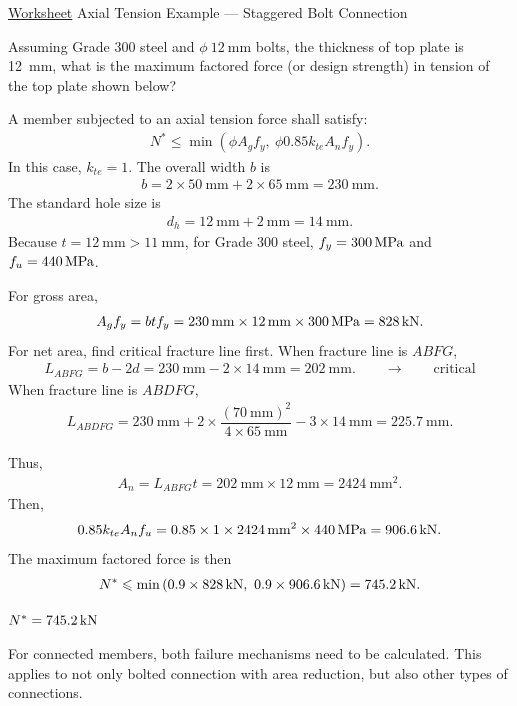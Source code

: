\begin{exmp}\href{run:./WORKSHEET/CH03/EX3.ATBC.sm}{Worksheet}
Axial Tension Example --- Staggered Bolt Connection

Assuming Grade 300 steel and $\phi~\SI{12}{\mm}$ bolts, the thickness of top plate is \SI{12}{\mm}, what is the maximum factored force (or design strength) in tension of the top plate shown below?
\begin{figure}[H]

\end{figure}
\end{exmp}
\begin{solution}
A member subjected to an axial tension force shall satisfy:
\begin{gather*}
N^*\leqslant\min\left(\phi{}A_gf_y,~\phi{}0.85k_{te}A_nf_y\right).
\end{gather*}
In this case, $k_{te}=1$. The overall width $b$ is
\begin{gather*}
b=2\times\SI{50}{\mm}+2\times\SI{65}{\mm}=\SI{230}{\mm}.
\end{gather*}
The standard hole size is
\begin{gather*}
d_h=\SI{12}{\mm}+\SI{2}{\mm}=\SI{14}{\mm}.
\end{gather*}
Because $t=\SI{12}{\mm}>\SI{11}{\mm}$, for Grade 300 steel, $f_y=\SI{300}{\mega\pascal}$ and $f_u=\SI{440}{\mega\pascal}$.

For gross area,
\begin{gather*}
A_gf_y=btf_y=\SI{230}{\milli\meter}\times\SI{12}{\milli\meter}\times\SI{300}{\mega\pascal}=\SI{828}{\kilo\newton}.
\end{gather*}
For net area, find critical fracture line first. When fracture line is $ABFG$,
\begin{gather*} L_{ABFG}=b-2d=\SI{230}{\mm}-2\times\SI{14}{\mm}=\SI{202}{\mm}.\qquad\rightarrow\qquad\text{critical}
\end{gather*}
When fracture line is $ABDFG$,
\begin{gather*}
L_{ABDFG}=\SI{230}{\mm}+2\times\dfrac{\left(\SI{70}{\mm}\right)^2}{4\times\SI{65}{\mm}}-3\times\SI{14}{\mm}=\SI{225.7}{\mm}.
\end{gather*}
\begin{figure}[H]\centering
\end{figure}
Thus,
\begin{gather*}
A_n=L_{ABFG}t=\SI{202}{\mm}\times\SI{12}{\mm}=\SI{2424}{\mm^2}.
\end{gather*}
Then,
\begin{gather*}
0.85k_{te}A_nf_u=0.85\times1\times\SI{2424}{\milli\meter^2}\times\SI{440}{\mega\pascal}=\SI{906.6}{\kilo\newton}.
\end{gather*}
The maximum factored force is then
\begin{gather*}
N^*\leqslant\min\left(0.9\times\SI{828}{\kilo\newton},~0.9\times\SI{906.6}{\kilo\newton}\right)=\SI{745.2}{\kilo\newton}.
\end{gather*}
\begin{flushright}
$N^*=\SI{745.2}{\kilo\newton}$
\end{flushright}
\end{solution}
For connected members, both failure mechanisms need to be calculated. This applies to not only bolted connection with area reduction, but also other types of connections.

